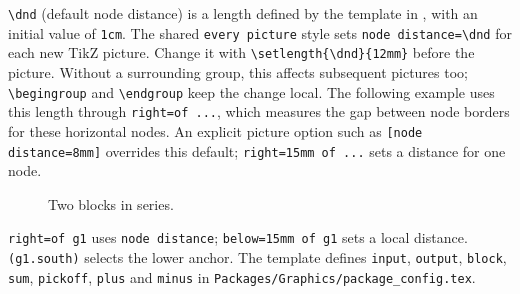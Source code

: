 \begin{referencecode}

\end{referencecode}
\verb|\dnd| (default node distance) is a length defined by the template
in , with an initial value
of \texttt{1cm}. The shared \texttt{every picture} style sets
\verb|node distance=\dnd| for each new TikZ picture.
Change it with \verb|\setlength{\dnd}{12mm}| before the picture.
Without a surrounding group, this affects subsequent pictures too;
\verb|\begingroup| and \verb|\endgroup| keep the change local.
The following example uses this length through \verb|right=of ...|,
which measures the gap between node borders for these horizontal nodes.
An explicit picture option such as \verb|[node distance=8mm]| overrides
this default; \verb|right=15mm of ...| sets a distance for one node.

\begin{referencecode}
\begingroup
\setlength{\dnd}{12mm}
\endgroup
\end{referencecode}

\begin{figure}[H]\centering

\begingroup
\setlength{\dnd}{12mm}
\endgroup

\caption{Two blocks in series.}\label{fig:series-blocks}
\end{figure}
\verb|right=of g1| uses \texttt{node distance};
\verb|below=15mm of g1| sets a local distance.
\verb|(g1.south)| selects the lower anchor.
The template defines \texttt{input}, \texttt{output}, \texttt{block},
\texttt{sum}, \texttt{pickoff}, \texttt{plus} and \texttt{minus} in
\texttt{Packages/Graphics/package\_config.tex}.


